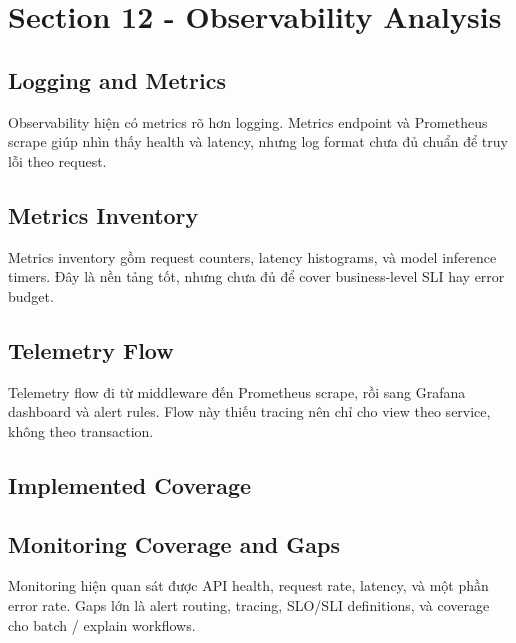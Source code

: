 \section{Section 12 - Observability Analysis}
\subsection{Logging and Metrics}
Observability hiện có metrics rõ hơn logging. Metrics endpoint và Prometheus scrape giúp nhìn thấy health và latency, nhưng log format chưa đủ chuẩn để truy lỗi theo request.

\subsection{Metrics Inventory}
Metrics inventory gồm request counters, latency histograms, và model inference timers. Đây là nền tảng tốt, nhưng chưa đủ để cover business-level SLI hay error budget.

\subsection{Telemetry Flow}
Telemetry flow đi từ middleware đến Prometheus scrape, rồi sang Grafana dashboard và alert rules. Flow này thiếu tracing nên chỉ cho view theo service, không theo transaction.

\subsection{Implemented Coverage}
\subsection{Monitoring Coverage and Gaps}
Monitoring hiện quan sát được API health, request rate, latency, và một phần error rate. Gaps lớn là alert routing, tracing, SLO/SLI definitions, và coverage cho batch / explain workflows.

